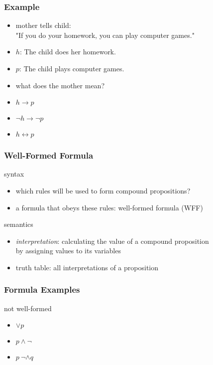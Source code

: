 \documentclass[dvipsnames]{beamer}
\begin{document}
\begin{frame}
  \frametitle{Example}

  \begin{itemize}
    \item mother tells child:\\
      "If you do your homework, you can play computer games."

    \pause
    \medskip
    \item $h$: The child does her homework.
    \item $p$: The child plays computer games.
    \item what does the mother mean?

    \pause
    \medskip
    \item $h \rightarrow p$
    \pause
    \item $\neg h \rightarrow \neg p$
    \pause
    \item $h \leftrightarrow p$
  \end{itemize}
\end{frame}


\begin{frame}
  \frametitle{Well-Formed Formula}

  syntax
  \begin{itemize}
    \item which rules will be used to form compound propositions?
    \item a formula that obeys these rules: \alert{well-formed formula} (WFF)
  \end{itemize}

  \pause
  \bigskip
  semantics
  \begin{itemize}
    \item \emph{interpretation}: calculating the value of a
      compound proposition\\
      by assigning values to its variables
    \item truth table: all interpretations of a proposition
  \end{itemize}
\end{frame}

\begin{frame}
  \frametitle{Formula Examples}

  \begin{exampleblock}{not well-formed}
    \begin{itemize}
      \item $\vee p$
      \item $p \wedge \neg$
      \item $p~\neg \wedge q$
    \end{itemize}
  \end{exampleblock}
\end{frame}
\end{document}
